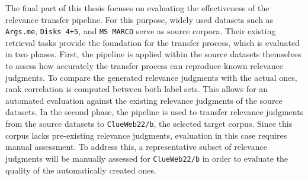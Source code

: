 The final part of this thesis focuses on evaluating the effectiveness of the relevance transfer pipeline. For this purpose, widely used datasets such as \texttt{Args.me}, \texttt{Disks 4+5}, and \texttt{MS MARCO} serve as source corpora. Their existing retrieval tasks provide the foundation for the transfer process, which is evaluated in two phases. First, the pipeline is applied within the source datasets themselves to assess how accurately the transfer process can reproduce known relevance judgments. To compare the generated relevance judgments with the actual ones, rank correlation is computed between both label sets. This allows for an automated evaluation against the existing relevance judgments of the source datasets. In the second phase, the pipeline is used to transfer relevance judgments from the source datasets to \texttt{ClueWeb22/b}, the selected target corpus. Since this corpus lacks pre-existing relevance judgments, evaluation in this case requires manual assessment. To address this, a representative subset of relevance judgments will be manually assessed for \texttt{ClueWeb22/b} in order to evaluate the quality of the automatically created ones.